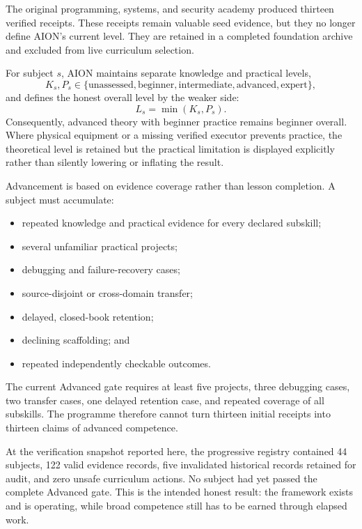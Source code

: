 The original programming, systems, and security academy produced thirteen
verified receipts.  These receipts remain valuable seed evidence, but they no
longer define AION's current level.  They are retained in a completed foundation
archive and excluded from live curriculum selection.

For subject $s$, AION maintains separate knowledge and practical levels,
\begin{equation}
K_s,P_s\in
\{\text{unassessed},\text{beginner},\text{intermediate},
  \text{advanced},\text{expert}\},
\end{equation}
and defines the honest overall level by the weaker side:
\begin{equation}
L_s=\min(K_s,P_s).
\label{eq:aion-competency-minimum}
\end{equation}
Consequently, advanced theory with beginner practice remains beginner overall.
Where physical equipment or a missing verified executor prevents practice, the
theoretical level is retained but the practical limitation is displayed
explicitly rather than silently lowering or inflating the result.

Advancement is based on evidence coverage rather than lesson completion.  A
subject must accumulate:
\begin{itemize}
    \item repeated knowledge and practical evidence for every declared
          subskill;
    \item several unfamiliar practical projects;
    \item debugging and failure-recovery cases;
    \item source-disjoint or cross-domain transfer;
    \item delayed, closed-book retention;
    \item declining scaffolding; and
    \item repeated independently checkable outcomes.
\end{itemize}
The current Advanced gate requires at least five projects, three debugging
cases, two transfer cases, one delayed retention case, and repeated coverage of
all subskills.  The programme therefore cannot turn thirteen initial receipts
into thirteen claims of advanced competence.

At the verification snapshot reported here, the progressive registry contained
44 subjects, 122 valid evidence records, five invalidated historical records
retained for audit, and zero unsafe curriculum actions.  No subject had yet
passed the complete Advanced gate.  This is the intended honest result: the
framework exists and is operating, while broad competence still has to be
earned through elapsed work.

